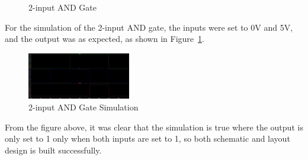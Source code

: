 \documentclass[conference]{IEEEtran}
\begin{document}
\begin{figure}[h]
    \centering
    \hfill
    \caption{2-input AND Gate}
\end{figure}

For the simulation of the 2-input AND gate, the inputs were set to 0V and 5V, and the output was as expected, as shown in Figure~\ref{fig:2inputANDGateSimulation}.
\begin{figure}[h]
    \centering
    \includegraphics[width=0.4\textwidth]{assets/2inputANDGateSimulation.jpg}
    \caption{2-input AND Gate Simulation}
    \label{fig:2inputANDGateSimulation}
\end{figure}
From the figure above, it was clear that the simulation is true where the output is only set to 1 only when both inputs are set to 1, so both schematic and layout design is built successfully.
\end{document}
